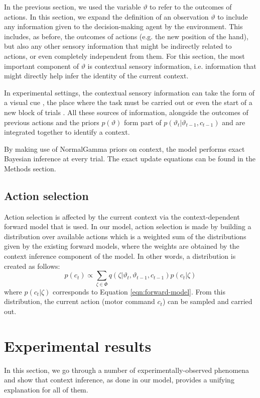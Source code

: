 \documentclass[a4paper,doc,floatsintext,natbib]{apa6}
\def \eref #1{Equation \ref{#1}}   %
\begin{document}
In the previous section, we used the variable $\vartheta$ to refer to the outcomes of actions. In this section, we expand the definition of an observation $\vartheta$ to include any information given to the decision-making agent by the environment. This includes, as before, the outcomes of actions (e.g. the new position of the hand), but also any other sensory information that might be indirectly related to actions, or even completely independent from them. For this section, the most important component of $\vartheta$ is contextual sensory information, i.e. information that might directly help infer the identity of the current context.

In experimental settings, the contextual sensory information can take the form of a visual cue \cite[e.g.][]{Lee_Dual_2009,Kim_Neural_2015}, the place where the task must be carried out \cite[e.g.][]{Forano_Timescales_2020,Shadmehr_Adaptive_1994} or even the start of a new block of trials \cite{Ethier_Spontaneous_2008}. All these sources of information, alongside the outcomes of previous actions and the priors $p(\vartheta)$ form part of $p(\vartheta_t | \vartheta_{t-1}, c_{t-1})$ and are integrated together to identify a context.

By making use of NormalGamma priors on context, the model performs exact Bayesian inference at every trial. The exact update equations can be found in the Methods section.

\subsection{Action selection}
Action selection is affected by the current context via the context-dependent forward model that is used. In our model, action selection is made by building a distribution over available actions which is a weighted sum of the distributions given by the existing forward models, where the weights are obtained by the context inference component of the model. In other words, a distribution is created as follows:
\begin{equation}
p(c_t) \propto \displaystyle\sum_{\zeta \in \Phi}q(\zeta | \vartheta_t, \vartheta_{t-1}, c_{t-1}) p(c_t | \zeta) \label{eq:action-selection}
\end{equation}
where $p(c_t | \zeta)$ corresponds to \eref{eqn:forward-model}. From this distribution, the current action (motor command $c_t$) can be sampled and carried out.

\section{Experimental results}
In this section, we go through a number of experimentally-observed phenomena and show that context inference, as done in our model, provides a unifying explanation for all of them.
\end{document}
